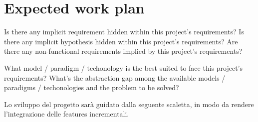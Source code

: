 \section{Expected work plan}

Is there any implicit requirement hidden within this project's requirements?
%
Is there any implicit hypothesis hidden within this project's requirements?
%
Are there any non-functional requirements implied by this project's requirements?

What model / paradigm / techonology is the best suited to face this project's requirements?
%
What's the abstraction gap among the available models / paradigms / techonologies and the problem to be solved?

Lo sviluppo del progetto sarà guidato dalla seguente scaletta, in modo da rendere l'integrazione delle features incrementali.

